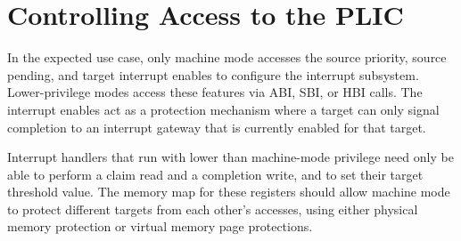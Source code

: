 \section{Controlling Access to the PLIC}

In the expected use case, only machine mode accesses the source
priority, source pending, and target interrupt enables to configure
the interrupt subsystem.  Lower-privilege modes access these features
via ABI, SBI, or HBI calls. The interrupt enables act as a protection
mechanism where a target can only signal completion to an interrupt
gateway that is currently enabled for that target.

Interrupt handlers that run with lower than machine-mode privilege
need only be able to perform a claim read and a completion write, and
to set their target threshold value.  The memory map for these
registers should allow machine mode to protect different targets from
each other's accesses, using either physical memory protection or
virtual memory page protections.

